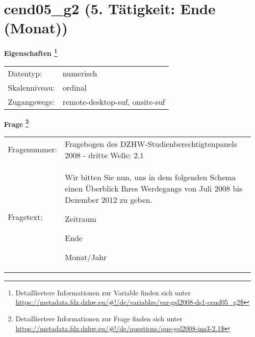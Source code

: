 
    \setcounter{footnote}{0}

    \vspace*{-1.8cm}
	\section{cend05\_g2 (5. Tätigkeit: Ende (Monat))}
	\label{section:cend05_g2}



    \vspace*{0.5cm}
    \noindent\textbf{Eigenschaften
	\footnote{Detailliertere Informationen zur Variable finden sich unter
		\url{https://metadata.fdz.dzhw.eu/\#!/de/variables/var-gsl2008-ds1-cend05_g2$}}}\\
	\begin{tabularx}{\hsize}{@{}lX}
	Datentyp: & numerisch \\
	Skalenniveau: & ordinal \\
	Zugangswege: &
	  remote-desktop-suf, 
	  onsite-suf
 \\
    \end{tabularx}



				\vspace*{0.5cm}
                \noindent\textbf{Frage
	                \footnote{Detailliertere Informationen zur Frage finden sich unter
		              \url{https://metadata.fdz.dzhw.eu/\#!/de/questions/que-gsl2008-ins3-2.1$}}}\\
				\begin{tabularx}{\hsize}{@{}lX}
					Fragenummer: &
					  Fragebogen des DZHW-Studienberechtigtenpanels 2008 - dritte Welle:
					  2.1
 \\
					Fragetext: & Wir bitten Sie nun, uns in dem folgenden Schema einen Überblick Ihres Werdegangs von Juli 2008 bis Dezember 2012 zu geben.\par  Zeitraum\par  Ende\par  Monat/Jahr \\
				\end{tabularx}





